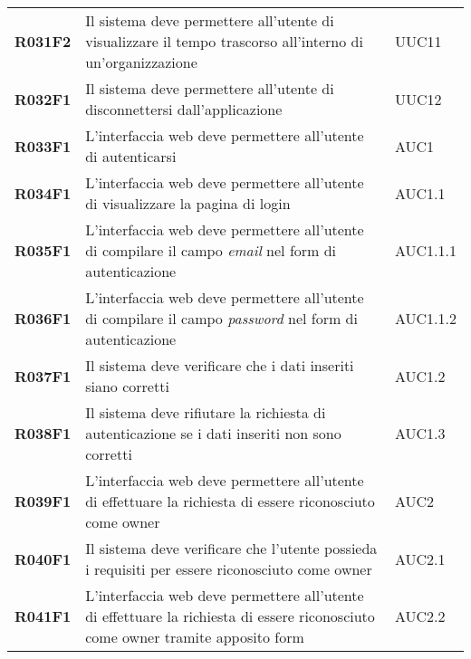 \documentclass[../analisi-dei-requisiti.tex]{subfiles}
\begin{document}
\begin{longtable}[H]{>{\centering\bfseries}m{3cm} >{\centering}m{10cm} >{\centering\arraybackslash}m{3cm}}
  R031F2                  & Il sistema deve permettere all'utente di visualizzare il tempo trascorso all'interno di un'organizzazione                                      & UUC11                         \\
  R032F1                  & Il sistema deve permettere all'utente di disconnettersi dall'applicazione                                                                      & UUC12                         \\
  R033F1                  & L'interfaccia web deve permettere all'utente di autenticarsi                                                                                   & AUC1                          \\
  R034F1                  & L'interfaccia web deve permettere all'utente di visualizzare la pagina di login                                                                & AUC1.1                        \\
  R035F1                  & L'interfaccia web deve permettere all'utente di compilare il campo \textit{email} nel form di autenticazione                                   & AUC1.1.1                      \\
  R036F1                  & L'interfaccia web deve permettere all'utente di compilare il campo \textit{password} nel form di autenticazione                                & AUC1.1.2                      \\
  R037F1                  & Il sistema deve verificare che i dati inseriti siano corretti                                                                                  & AUC1.2                        \\
  R038F1                  & Il sistema deve rifiutare la richiesta di autenticazione se i dati inseriti non sono corretti                                                  & AUC1.3                        \\
  R039F1                  & L'interfaccia web deve permettere all'utente di effettuare la richiesta di essere riconosciuto come owner                                      & AUC2                          \\
  R040F1                  & Il sistema deve verificare che l'utente possieda i requisiti per essere riconosciuto come owner                                                & AUC2.1                        \\
  R041F1                  & L'interfaccia web deve permettere all'utente di effettuare la richiesta di essere riconosciuto come owner tramite apposito form                & AUC2.2                        \\

\end{longtable}
\end{document}

